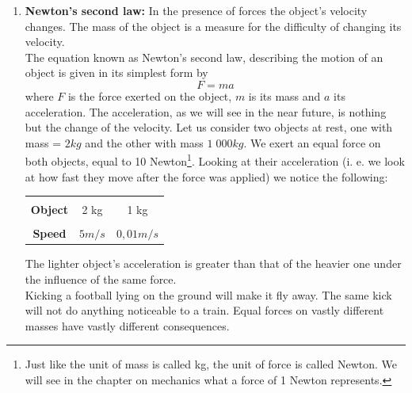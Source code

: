 \begin{enumerate}
\noindent So why does everything around seem to come to a standstill? Well, because the surface on which the object is moving, as well as the air around it exert a frictional force on the moving object which makes it stop. The first of Newton's law states that in the absence of such forces, once in motion the object remains indefinitely in motion. An astronaut drifting away from her space-shuttle will keep on drifting indefinitely.

\item \textbf{Newton's second law:} In the presence of forces the object's velocity changes. The mass of the object is a measure for the difficulty of changing its velocity.\\

\noindent The equation known as Newton's second law, describing the motion of an object is given in its simplest form by
\begin{equation}
F = m a
\end{equation}
where $F$ is the force exerted on the object, $m$ is its mass and $a$ its acceleration. The acceleration, as we will see in the near future, is nothing but the change of the velocity. Let us consider two objects at rest, one with mass = $2 kg$ and the other with mass $1\; 000 kg$. We exert an equal force on both objects, equal to 10 Newton\footnote{Just like the unit of mass is called kg, the unit of force is called Newton. We will see in the chapter on mechanics what a force of 1 Newton represents.}. Looking at their acceleration (i. e. we look at how fast they move after the force was applied) we notice the following:
\begin{center}
\begin{tabular}{|c|c|c|}
  \hline
	& & \\
  \textbf{Object} &2 kg  & 1\;000 kg \\
	\hline
  & & \\
	\textbf{Speed} & $5 m/s $ & $0,01 m/s $\\
  \hline
\end{tabular}
\end{center}
\noindent The lighter object's acceleration is greater than that of the heavier one under the influence of the same force.\\

\noindent Kicking a football lying on the ground will make it fly away. The same kick will not do anything noticeable to a train. Equal forces on vastly different masses have vastly different consequences.\\


\end{enumerate}
